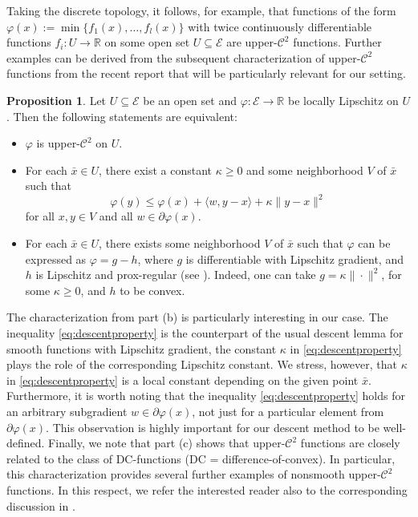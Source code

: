 \documentclass[a4paper, 12pt]{article}
\numberwithin{equation}{section}
\theoremstyle{bolddef}
\theoremstyle{definition}
\theoremstyle{boldplain}
\newtheorem{proposition}[definition]{Proposition}
\newcommand{\X}{\mathcal{E}}
\begin{document}
Taking the discrete topology, it follows, for example, that functions of
the form $ \varphi (x) := \min \big\{ f_1(x), \ldots, f_l(x) \big\} $ with
twice continuously differentiable functions $ f_i: U \to \mathbb{R} $
on some open set $ U \subseteq \X$ are upper-$\mathcal{C}^2 $ functions.
Further examples can be derived from the subsequent characterization
of upper-$\mathcal{C}^2$ functions from the recent 
report \cite[Prop.\ 3.2]{aragon2025} that will be particularly relevant 
for our setting.

\begin{proposition}\label{Prop:CharUpperC2}
Let $ U \subseteq \X $ be an open set and $ \varphi: \X
\to \mathbb{R} $ be locally Lipschitz on $ U $. Then the following statements
are equivalent:
\begin{itemize}
	\item[(a)] $ \varphi $ is upper-$\mathcal{C}^2 $ on $ U $.
	\item[(b)] For each $ \bar{x} \in U $, there exist a constant
	   $ \kappa \geq 0 $ and some neighborhood $ V $ of $ \bar{x} $ such 
	   that
	   \begin{equation}\label{eq:descentproperty}
	   	  \varphi (y) \leq \varphi (x) + \langle w, y-x \rangle + 
	   	  \kappa \| y - x \|^2
	   \end{equation}
	   for all $ x, y \in V $ and all $ w \in \partial \varphi (x) $.
 	\item[(c)] For each $ \bar{x} \in U $, there exists some neighborhood
 	   $ V $ of $ \bar{x} $ such that $ \varphi $ can be expressed as
 	   $ \varphi = g - h $, where $ g $ is differentiable with Lipschitz
		gradient, and $ h $ is Lipschitz and prox-regular (see \cite[Definition 3.27]{RockafellarWets2009}). Indeed, one can 
 	   take $ g = \kappa \| \cdot \|^2 $, for some $ \kappa \geq 0 $, and 
 	   $ h $ to be convex.
\end{itemize}
\end{proposition}

The characterization from part (b) is particularly interesting in our
case. The inequality \eqref{eq:descentproperty} is the counterpart of
the usual descent lemma for smooth functions with Lipschitz gradient,
the constant $ \kappa $ in \eqref{eq:descentproperty} plays the role
of the corresponding Lipschitz constant. We stress, however, that 
$ \kappa $ in \eqref{eq:descentproperty} is a local constant depending
on the given point $ \bar{x} $. Furthermore, it is worth noting that
the inequality \eqref{eq:descentproperty} holds for an arbitrary
subgradient $ w \in \partial \varphi (x) $, not just for a particular 
element from $ \partial \varphi (x) $. This observation is highly important for
our descent method to be well-defined. Finally, we note that 
part (c) shows that upper-$\mathcal{C}^2 $ functions are closely related to the
class of DC-functions (DC = difference-of-convex). In particular, this
characterization provides several further examples of nonsmooth 
upper-$\mathcal{C}^2 $ functions. In this respect, we refer the interested reader
also to the corresponding discussion in \cite{aragon2025}.
\end{document}
